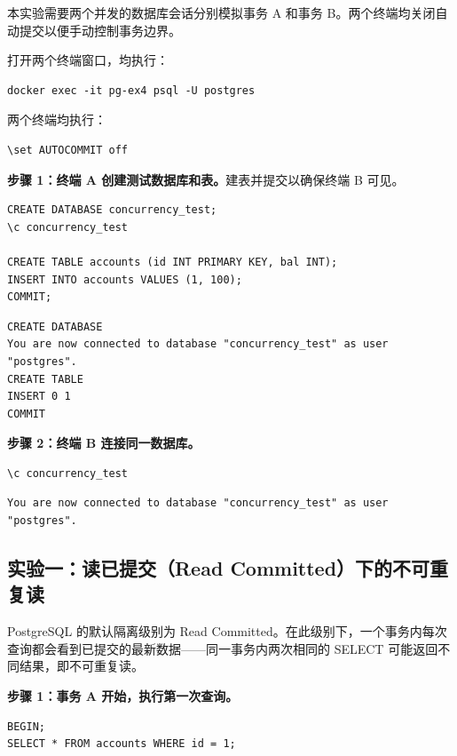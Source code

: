 \documentclass[12pt, a4paper]{academics}
\begin{document}
本实验需要两个并发的数据库会话分别模拟事务 A 和事务 B。两个终端均关闭自动提交以便手动控制事务边界。

打开两个终端窗口，均执行：

\begin{verbatim}
docker exec -it pg-ex4 psql -U postgres
\end{verbatim}

两个终端均执行：

\begin{verbatim}
\set AUTOCOMMIT off
\end{verbatim}

\textbf{步骤 1：终端 A 创建测试数据库和表。}建表并提交以确保终端 B 可见。

\begin{verbatim}
CREATE DATABASE concurrency_test;
\c concurrency_test

CREATE TABLE accounts (id INT PRIMARY KEY, bal INT);
INSERT INTO accounts VALUES (1, 100);
COMMIT;
\end{verbatim}

\begin{verbatim}
CREATE DATABASE
You are now connected to database "concurrency_test" as user "postgres".
CREATE TABLE
INSERT 0 1
COMMIT
\end{verbatim}

\textbf{步骤 2：终端 B 连接同一数据库。}

\begin{verbatim}
\c concurrency_test
\end{verbatim}

\begin{verbatim}
You are now connected to database "concurrency_test" as user "postgres".
\end{verbatim}

\subsection{实验一：读已提交（Read Committed）下的不可重复读}

PostgreSQL 的默认隔离级别为 Read Committed。在此级别下，一个事务内每次查询都会看到已提交的最新数据——同一事务内两次相同的 SELECT 可能返回不同结果，即不可重复读。

\textbf{步骤 1：事务 A 开始，执行第一次查询。}

\begin{verbatim}
BEGIN;
SELECT * FROM accounts WHERE id = 1;
\end{verbatim}
\end{document}
